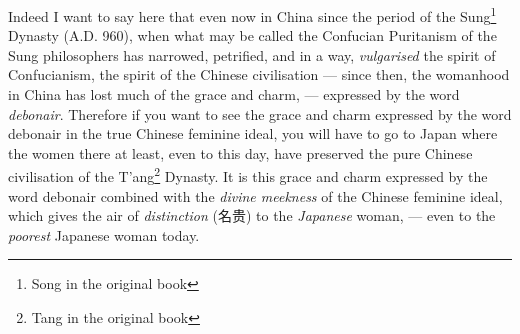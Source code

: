 Indeed I want to say here that even now in China since the period of the Sung\footnote{Song in the original book} Dynasty (A.D. 960), when what  may be called the Confucian Puritanism of the Sung philosophers  has narrowed, petrified, and in a way, \emph{vulgarised} the spirit of Confucianism, the spirit of the Chinese civilisation --- since then, the womanhood in China has lost much of the grace and charm, --- expressed by the word \emph{debonair}.
Therefore if you want to see the grace and charm expressed by the word debonair in the true Chinese feminine ideal, you will have to go to Japan where the women there at least, even to this day, have preserved the pure Chinese civilisation of the T'ang\footnote{Tang in the original book} Dynasty.
It is this grace and charm expressed by the word debonair combined with the \emph{divine meekness} of the Chinese feminine ideal, which gives the air of \emph{distinction} (名贵) to the \emph{Japanese} woman, --- even to the \emph{poorest} Japanese woman today.

